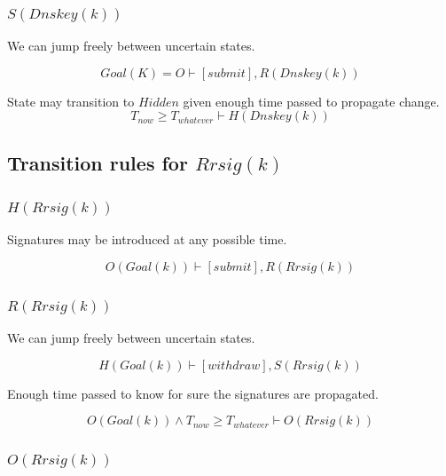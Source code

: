 \documentclass[twoside,english, a4paper]{article}
\newcommand{\mathbox}[1]{#1}
\begin{document}
\subsubsection{$S(Dnskey(k))$}

\mathbox{

	We can jump freely between uncertain states.

	\begin{equation}
			Goal(K)=O \vdash [submit], R(Dnskey(k))
	\end{equation}

	State may transition to $Hidden$ given enough time passed to propagate 
	change. 
	\begin{equation}
			T_{now} \geq T_{whatever} \vdash H(Dnskey(k))
	\end{equation}
}

\subsection{Transition rules for $Rrsig(k)$}

\subsubsection{$H(Rrsig(k))$}

\mathbox{
	Signatures may be introduced at any possible time.

	\begin{equation}
			O(Goal(k)) \vdash [submit], R(Rrsig(k))
	\end{equation}
}

\subsubsection{$R(Rrsig(k))$}

\mathbox{

	We can jump freely between uncertain states.
	
	\begin{equation}
		H(Goal(k)) \vdash [withdraw], S(Rrsig(k))
	\end{equation}

	Enough time passed to know for sure the signatures are propagated.
	
	\begin{equation}
		O(Goal(k)) \wedge T_{now} \geq T_{whatever} \vdash O(Rrsig(k))
	\end{equation}
}


\subsubsection{$O(Rrsig(k))$}
\end{document}
